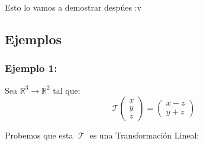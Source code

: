 \documentclass[12pt, fleqn]{report}                             %
\theoremstyle{break}                                            %
\DeclareMathOperator \LinTrans {\mathcal{T}}                    %
\newcommand{\VecLinTrans}[1]{\mathcal{T}\pVector{#1}}           %
\newcommand{\pVector}[1]                                        %
        { \ensuremath{\begin{pmatrix}#1\end{pmatrix}} }             %
\begin{document}
                Esto lo vamos a demostrar despúes :v




            \clearpage
            \subsection{Ejemplos}

                \subsubsection{Ejemplo 1:}
                    Sea $\mathbb{R}^3 \to \mathbb{R}^2$ tal que:
                    \begin{equation*}
                        \VecLinTrans{x\\y\\z}  = \pVector{x-z\\y+z}
                    \end{equation*}

                    Probemos que esta $\LinTrans$ es una Transformación Lineal:
\end{document}
